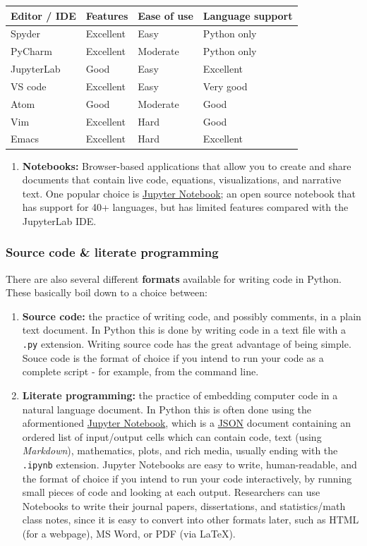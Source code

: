 \documentclass[]{book}
\providecommand{\tightlist}{%
  \setlength{\itemsep}{0pt}\setlength{\parskip}{0pt}}
\begin{document}
\begin{longtable}[]{@{}llll@{}}
\toprule
Editor / IDE & Features & Ease of use & Language support\tabularnewline
\midrule
\endhead
Spyder & Excellent & Easy & Python only\tabularnewline
PyCharm & Excellent & Moderate & Python only\tabularnewline
JupyterLab & Good & Easy & Excellent\tabularnewline
VS code & Excellent & Easy & Very good\tabularnewline
Atom & Good & Moderate & Good\tabularnewline
Vim & Excellent & Hard & Good\tabularnewline
Emacs & Excellent & Hard & Excellent\tabularnewline
\bottomrule
\end{longtable}

\begin{enumerate}
\def\labelenumi{\arabic{enumi}.}
\setcounter{enumi}{1}
\tightlist
\item
  \textbf{Notebooks:} Browser-based applications that allow you to create and share documents that contain live code, equations, visualizations, and narrative text. One popular choice is \href{https://jupyter.org/}{Jupyter Notebook}; an open source notebook that has support for 40+ languages, but has limited features compared with the JupyterLab IDE.
\end{enumerate}

\hypertarget{source-code-literate-programming-1}{%
\subsubsection{Source code \& literate programming}\label{source-code-literate-programming-1}}

There are also several different \textbf{formats} available for writing code in Python.
These basically boil down to a choice between:

\begin{enumerate}
\def\labelenumi{\arabic{enumi}.}
\item
  \textbf{Source code:} the practice of writing code, and possibly comments, in a plain text document. In Python this is done by writing code in a text file with a \texttt{.py} extension. Writing source code has the great advantage of being simple. Souce code is the format of choice if you intend to run your code as a complete script - for example, from the command line.
\item
  \textbf{Literate programming:} the practice of embedding computer code in a natural language document. In Python this is often done using the aformentioned \href{https://jupyter.org/}{Jupyter Notebook}, which is a \href{https://www.json.org/json-en.html}{JSON} document containing an ordered list of input/output cells which can contain code, text (using \emph{Markdown}), mathematics, plots, and rich media, usually ending with the \texttt{.ipynb} extension. Jupyter Notebooks are easy to write, human-readable, and the format of choice if you intend to run your code interactively, by running small pieces of code and looking at each output. Researchers can use Notebooks to write their journal papers, dissertations, and statistics/math class notes, since it is easy to convert into other formats later, such as HTML (for a webpage), MS Word, or PDF (via LaTeX).
\end{enumerate}
\end{document}

